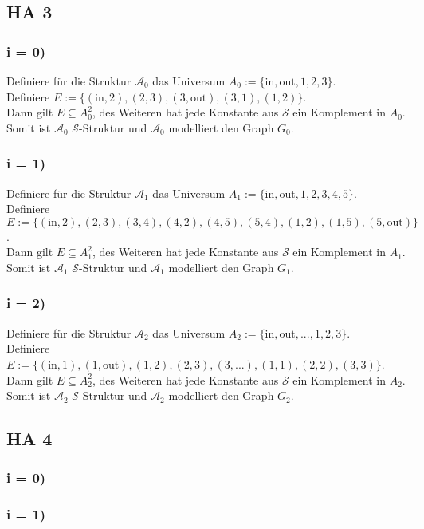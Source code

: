 \documentclass[12pt, a4paper]{article}
\begin{document}
\subsection*{HA 3}
\subsubsection*{i = 0)}
Definiere für die Struktur \(\mathcal A_0\) das Universum \(A_0 := \{\text{in}, \text{out}, 1, 2, 3\}\). \\
Definiere \(E := \{(\text{in}, 2), (2, 3), (3, \text{out}), (3,1), (1,2)\}\). \\
Dann gilt \(E \subseteq A_0^2\), des Weiteren hat jede Konstante aus \(\mathcal S\) ein Komplement in \(A_0\).\\
Somit ist \(\mathcal A_0\) \(\mathcal S\)-Struktur und \(\mathcal A_0\) modelliert den Graph \(G_0\).
\subsubsection*{i = 1)}
Definiere für die Struktur \(\mathcal A_1\) das Universum \(A_1 := \{\text{in}, \text{out}, 1, 2, 3, 4, 5\}\). \\
Definiere \(E := \{(\text{in}, 2), (2, 3), (3, 4), (4,2), (4,5), (5,4), (1,2), (1,5), (5, \text{out})\}\). \\
Dann gilt \(E \subseteq A_1^2\), des Weiteren hat jede Konstante aus \(\mathcal S\) ein Komplement in \(A_1\).\\
Somit ist \(\mathcal A_1\) \(\mathcal S\)-Struktur und \(\mathcal A_1\) modelliert den Graph \(G_1\).
\subsubsection*{i = 2)}
Definiere für die Struktur \(\mathcal A_2\) das Universum \(A_2 := \{\text{in}, \text{out}, \text{...}, 1, 2, 3\}\). \\
Definiere \(E := \{(\text{in}, 1), (1, \text{out}), (1, 2), (2,3), (3, \text{...}), (1,1), (2,2), (3,3)\}\). \\
Dann gilt \(E \subseteq A_2^2\), des Weiteren hat jede Konstante aus \(\mathcal S\) ein Komplement in \(A_2\).\\
Somit ist \(\mathcal A_2\) \(\mathcal S\)-Struktur und \(\mathcal A_2\) modelliert den Graph \(G_2\).
\subsection*{HA 4}
\subsubsection*{i = 0)}
\subsubsection*{i = 1)}
\end{document}
